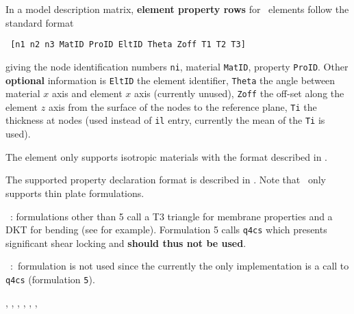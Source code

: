 

  In a model description matrix, {\bf element property rows} for \triaa\   elements follow the standard format

\begin{verbatim}
 [n1 n2 n3 MatID ProID EltID Theta Zoff T1 T2 T3] 
\end{verbatim}


\noindent giving the node identification numbers {\tt ni}, material {\tt MatID}, property {\tt ProID}. Other {\bf optional} information is {\tt EltID} the element identifier, {\tt Theta} the angle between material $x$ axis and element $x$ axis (currently unused), {\tt Zoff} the off-set along the element $z$ axis from the surface of the nodes to the reference plane, {\tt Ti} the thickness at nodes (used instead of {\tt il} entry, currently the mean of the {\tt Ti} is used). \par

The element only supports isotropic materials with the format described in \melastic.

\noindent The supported property declaration format is described in \pshell. Note that \triaa\ only supports thin plate formulations.

\vs\noindent  \triaa\ : \pshell formulations other than 5 call a T3 triangle for membrane properties and a DKT for bending (see  for example). Formulation 5 calls {\tt q4cs} which presents significant shear locking and {\bf should thus not be used}. 

\vs\triac\ :\pshell\ formulation is not used since the currently the only implementation is a call to {\tt q4cs} (formulation {\tt 5}). 


\noindent  \quada, \quadb, \femat, \pshell, \melastic, \femk, \feplot





